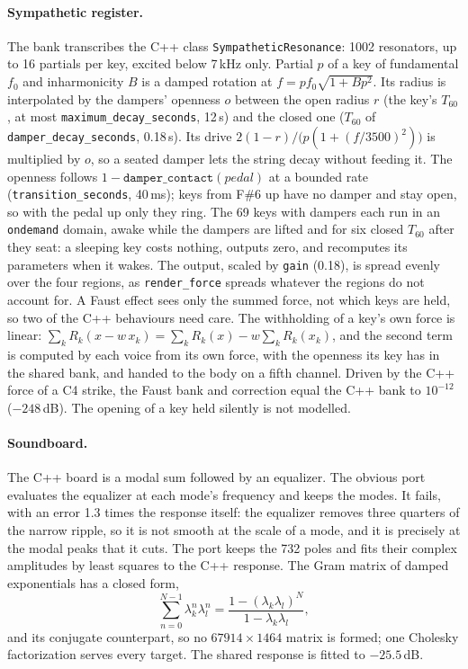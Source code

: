 \documentclass[10pt,a4paper,twocolumn]{article}
\newcommand{\code}[1]{\texttt{#1}}
\begin{document}
\paragraph{Sympathetic register.} The bank transcribes the C++ class \code{SympatheticResonance}: 1002 resonators, up to 16 partials per key, excited below 7\,kHz only. Partial $p$ of a key of fundamental $f_0$ and inharmonicity $B$ is a damped rotation at $f = pf_0\sqrt{1+Bp^2}$. Its radius is interpolated by the dampers' openness $o$ between the open radius $r$ (the key's $T_{60}$, at most \code{maximum\_decay\_seconds}, 12\,s) and the closed one ($T_{60}$ of \code{damper\_decay\_seconds}, 0.18\,s). Its drive $2(1-r)/\big(p(1+(f/3500)^2)\big)$ is multiplied by $o$, so a seated damper lets the string decay without feeding it. The openness follows $1 - \code{damper\_contact}(\mathit{pedal})$ at a bounded rate (\code{transition\_seconds}, 40\,ms); keys from F\#6 up have no damper and stay open, so with the pedal up only they ring. The 69 keys with dampers each run in an \code{ondemand} domain, awake while the dampers are lifted and for six closed $T_{60}$ after they seat: a sleeping key costs nothing, outputs zero, and recomputes its parameters when it wakes. The output, scaled by \code{gain} (0.18), is spread evenly over the four regions, as \code{render\_force} spreads whatever the regions do not account for. A Faust effect sees only the summed force, not which keys are held, so two of the C++ behaviours need care. The withholding of a key's own force is linear: $\sum_k R_k(x - w\,x_k) = \sum_k R_k(x) - w\sum_k R_k(x_k)$, and the second term is computed by each voice from its own force, with the openness its key has in the shared bank, and handed to the body on a fifth channel. Driven by the C++ force of a C4 strike, the Faust bank and correction equal the C++ bank to $10^{-12}$ ($-248$\,dB). The opening of a key held silently is not modelled.

\paragraph{Soundboard.} The C++ board is a modal sum followed by an equalizer. The obvious port evaluates the equalizer at each mode's frequency and keeps the modes. It fails, with an error 1.3 times the response itself: the equalizer removes three quarters of the narrow ripple, so it is not smooth at the scale of a mode, and it is precisely at the modal peaks that it cuts. The port keeps the 732 poles and fits their complex amplitudes by least squares to the C++ response. The Gram matrix of damped exponentials has a closed form,
\begin{equation}
\sum_{n=0}^{N-1}\lambda_k^n\lambda_l^n = \frac{1 - (\lambda_k\lambda_l)^N}{1 - \lambda_k\lambda_l},
\end{equation}
and its conjugate counterpart, so no $67914 \times 1464$ matrix is formed; one Cholesky factorization serves every target. The shared response is fitted to $-25.5$\,dB.
\end{document}
